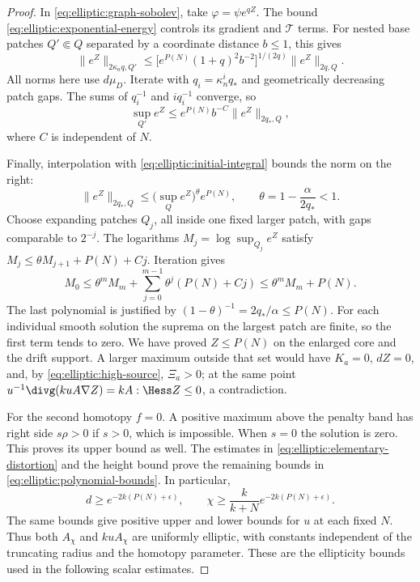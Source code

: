 \begin{proof}
In \eqref{eq:elliptic:graph-sobolev}, take
$\varphi=\psi e^{qZ}$.  The bound
\eqref{eq:elliptic:exponential-energy} controls its gradient and
$\mathcal T$ terms.  For nested base
patches $Q'\Subset Q$ separated by a coordinate distance $b\le1$,
this gives
\[
 \|e^Z\|_{2\kappa_nq,Q'}
 \le\bigl[e^{P(N)}(1+q)^2b^{-2}\bigr]^{1/(2q)}
                          \|e^Z\|_{2q,Q}.
\]
All norms here use $d\mu_D$.  Iterate with
$q_i=\kappa_n^iq_*$ and geometrically decreasing patch gaps.
The sums of $q_i^{-1}$ and $i q_i^{-1}$ converge, so
\begin{equation}\label{eq:elliptic:moser-output}
 \sup_{Q'}e^Z
 \le e^{P(N)}b^{-C}\|e^Z\|_{2q_*,Q},
\end{equation}
where $C$ is independent of $N$.

Finally, interpolation with
\eqref{eq:elliptic:initial-integral} bounds the norm on the right:
\[
 \|e^Z\|_{2q_*,Q}
 \le \bigl(\sup_Qe^Z\bigr)^\theta e^{P(N)},
 \qquad \theta=1-\frac\alpha{2q_*}<1.
\]
Choose expanding patches $Q_j$, all inside one fixed larger patch,
with gaps comparable to $2^{-j}$.  The logarithms $M_j=\log\sup_{Q_j}e^Z$
satisfy $M_j\le\theta M_{j+1}+P(N)+Cj$.
Iteration gives
\[
 M_0\le\theta^mM_m+
          \sum_{j=0}^{m-1}\theta^j(P(N)+Cj)\le\theta^mM_m+P(N).
\]
The last polynomial is justified by
$(1-\theta)^{-1}=2q_*/\alpha\le P(N)$.
For each individual smooth solution the suprema on the largest patch
are finite, so the first term tends to zero.  We have proved
$Z\le P(N)$ on the enlarged core and the drift support.  A larger
maximum outside that set would have $K_a=0$, $dZ=0$, and, by
\eqref{eq:elliptic:high-source}, $\Xi_a>0$; at the same point
$u^{-1}\divg(kuA\nabla Z)=kA:\Hess Z\le0$, a contradiction.

For the second homotopy $f=0$.  A positive maximum above the penalty
band has right side $s\rho>0$ if $s>0$, which is impossible.  When
$s=0$ the solution is zero.  This proves its upper bound as well.
The estimates in \eqref{eq:elliptic:elementary-distortion} and the height bound
prove the remaining bounds in
\eqref{eq:elliptic:polynomial-bounds}.  In particular,
\[
 d\ge e^{-2k(P(N)+\epsilon)},\qquad
 \chi\ge\frac{k}{k+N}e^{-2k(P(N)+\epsilon)}.
\]
The same bounds give positive upper and lower bounds for $u$ at each
fixed $N$.  Thus both $A_\chi$ and $kuA_\chi$ are uniformly elliptic,
with constants independent of the truncating radius and the homotopy
parameter.  These are the ellipticity bounds used in the following
scalar estimates.
\end{proof}

